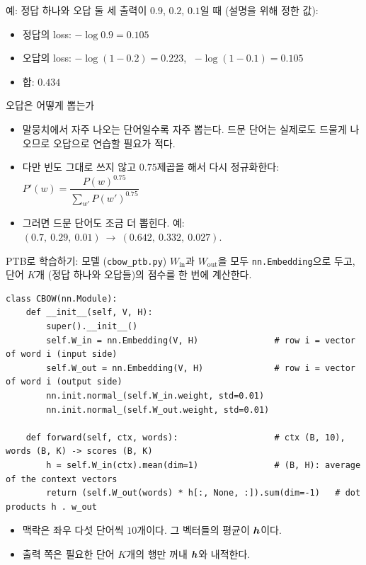 \documentclass[aspectratio=169,11pt]{beamer}
\begin{document}
\begin{frame}{예: 정답 하나와 오답 둘}
\vskip1mm
세 출력이 $0.9$, $0.2$, $0.1$일 때 (설명을 위해 정한 값):
\begin{itemize}
\item 정답의 loss: $-\log0.9=0.105$
\item 오답의 loss: $-\log(1-0.2)=0.223$, \ $-\log(1-0.1)=0.105$
\item 합: $0.434$
\end{itemize}
\end{frame}

\begin{frame}{오답은 어떻게 뽑는가}
\begin{itemize}
\item 말뭉치에서 자주 나오는 단어일수록 자주 뽑는다.
드문 단어는 실제로도 드물게 나오므로 오답으로 연습할 필요가 적다.
\item 다만 빈도 그대로 쓰지 않고 $0.75$제곱을 해서 다시 정규화한다:
\ $P'(w)=\dfrac{P(w)^{0.75}}{\sum_{w'}P(w')^{0.75}}$
\item 그러면 드문 단어도 조금 더 뽑힌다. 예: $(0.7,\ 0.29,\ 0.01)\ \to\ (0.642,\ 0.332,\ 0.027)$.
\end{itemize}
\end{frame}

\begin{frame}[fragile]{PTB로 학습하기: 모델 (\texttt{cbow\_ptb.py})}
$W_{\text{in}}$과 $W_{\text{out}}$을 모두 \texttt{nn.Embedding}으로 두고,
단어 $K$개 (정답 하나와 오답들)의 점수를 한 번에 계산한다.
\begin{lstlisting}
class CBOW(nn.Module):
    def __init__(self, V, H):
        super().__init__()
        self.W_in = nn.Embedding(V, H)               # row i = vector of word i (input side)
        self.W_out = nn.Embedding(V, H)              # row i = vector of word i (output side)
        nn.init.normal_(self.W_in.weight, std=0.01)
        nn.init.normal_(self.W_out.weight, std=0.01)

    def forward(self, ctx, words):                   # ctx (B, 10), words (B, K) -> scores (B, K)
        h = self.W_in(ctx).mean(dim=1)               # (B, H): average of the context vectors
        return (self.W_out(words) * h[:, None, :]).sum(dim=-1)   # dot products h . w_out
\end{lstlisting}
\begin{itemize}
\item 맥락은 좌우 다섯 단어씩 $10$개이다. 그 벡터들의 평균이 $\bm{h}$이다.
\item 출력 쪽은 필요한 단어 $K$개의 행만 꺼내 $\bm{h}$와 내적한다.
\end{itemize}
\end{frame}
\end{document}
